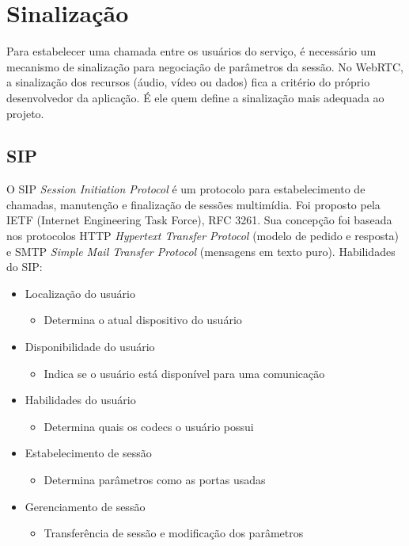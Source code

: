 \documentclass[ruledheader]{abnt} %
\begin{document}
\section{Sinalização}
\label{s_sinalizacao}
Para estabelecer uma chamada entre os usuários do serviço, é necessário um mecanismo de sinalização para negociação de parâmetros da sessão. No WebRTC, a sinalização dos recursos (áudio, vídeo ou dados) fica a critério do próprio desenvolvedor da aplicação. É ele quem define a sinalização mais adequada ao projeto.

\subsection{SIP}
\label{ss_sip}
O SIP \textit{Session Initiation Protocol} é um protocolo para estabelecimento de chamadas, manutenção e finalização de sessões multimídia. Foi proposto pela IETF (Internet Engineering Task Force), RFC 3261.
Sua concepção foi baseada nos protocolos HTTP \textit{Hypertext Transfer Protocol} (modelo de pedido e resposta) e SMTP \textit{Simple Mail Transfer Protocol} (mensagens em texto puro). \cite{MELLO}
Habilidades do SIP:
\begin{itemize}
 \item Localização do usuário
    \begin{itemize}
    \item  Determina o atual dispositivo do usuário
    \end{itemize}
 \item Disponibilidade do usuário
    \begin{itemize}
	 \item  Indica se o usuário está disponível para uma comunicação
    \end{itemize}
 \item Habilidades do usuário
    \begin{itemize}
	 \item  Determina quais os codecs o usuário possui
    \end{itemize}
 \item Estabelecimento de sessão
    \begin{itemize}
	 \item  Determina parâmetros como as portas usadas
    \end{itemize}
 \item Gerenciamento de sessão
    \begin{itemize}
	 \item  Transferência de sessão e modificação dos parâmetros
    \end{itemize}
\end{itemize}
\end{document}
